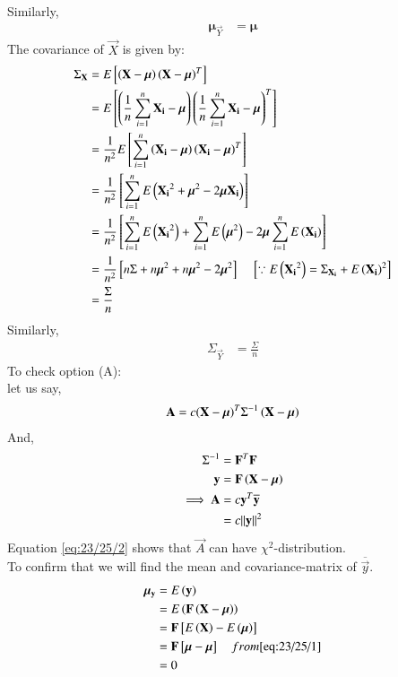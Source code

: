 \documentclass[journal,12pt,onecolumn]{IEEEtran}
\theoremstyle{remark}
\begin{document}
Similarly,
\begin{align}
{\bm{\mu}}_{\vec{Y}} &= \bm{\mu}
\end{align}
The covariance of $\vec{X}$ is given by: 
\begin{align}
\Sigma_{\mathbf{X}} &= E{}\left[\left(\mathbf{X}-\bm{\mu}\right){\left(\mathbf{X}-\bm{\mu}\right)}^T\right] \\
                 &= E{}\left[\left(\frac{1}{n}\sum_{i=1}^{n}\mathbf{X_i}-\bm{\mu}\right){\left(\frac{1}{n}\sum_{i=1}^{n}\mathbf{X_i}-\bm{\mu}\right)}^T\right] \\
                 &= \frac{1}{n^2}E{}\left[\sum_{i=1}^{n}\left(\mathbf{X_i}-\bm{\mu}\right){\left(\mathbf{X_i}-\bm{\mu}\right)}^T\right] \\
                 &= \frac{1}{n^2}{}\left[\sum_{i=1}^{n}E\left({\mathbf{X_i}}^2+{\bm{\mu}}^2-2\bm{\mu}\mathbf{X_i}\right)\right] \\
                 &= \frac{1}{n^2}{}\left[\sum_{i=1}^{n}E\left({\mathbf{X_i}}^2\right)+\sum_{i=1}^{n}E\left({\bm{\mu}}^2\right)-2\bm{\mu}\sum_{i=1}^{n}E\left(\mathbf{X_i}\right)\right] \\
                 &= \frac{1}{n^2}{}\left[n\Sigma+n{\bm{\mu}}^2+n{\bm{\mu}}^2-2{\bm{\mu}}^2\right] \quad {}\left[\because E\left({\mathbf{X_i}}^2\right)={\Sigma}_{\mathbf{X_i}}+{E\left(\mathbf{X_i}\right)}^2\right] \\
                 &= \frac{\Sigma}{n}         
\end{align}
Similarly,
\begin{align}
\Sigma_{\vec{Y}} &= \frac{\Sigma}{n} 
\end{align}
To check option (A): \\
let us say,
\begin{align}
\mathbf{A} &= c{\left(\mathbf{X}-\bm{\mu}\right)}^T{\Sigma}^{-1}\left(\mathbf{X}-\bm{\mu}\right) \\
\end{align}
And,
\begin{align}
{\Sigma}^{-1} &= {\mathbf{F}}^T\mathbf{F} \label{eq:23/25/3} \\
\mathbf{y} &= \mathbf{F}\left(\mathbf{X}-\bm{\mu}\right) \\
\implies \mathbf{A} &= c{\mathbf{y}}^T\overline{\mathbf{y}} \\
                 &= c{\left\lVert\mathbf{y}\right\rVert}^2  \label{eq:23/25/2}
\end{align}
Equation \eqref{eq:23/25/2} shows that $\vec{A}$ can have ${\chi}^2$-distribution. \\
To confirm that we will find the mean and covariance-matrix of $\overline{\vec{y}}$.
\begin{align}
{\bm{\mu}}_{\mathbf{y}} &= E\left(\mathbf{y}\right) \\
                           &= E\left(\mathbf{F}\left(\mathbf{X}-\bm{\mu}\right)\right) \\
                           &= \mathbf{F}{}\left[E\left(\mathbf{X}\right)-E\left(\bm{\mu}\right)\right] \\
                           &= \mathbf{F}{}\left[\bm{\mu}-\bm{\mu}\right] \quad from \eqref{eq:23/25/1} \\
                           &= 0 
\end{align}
\end{document}
